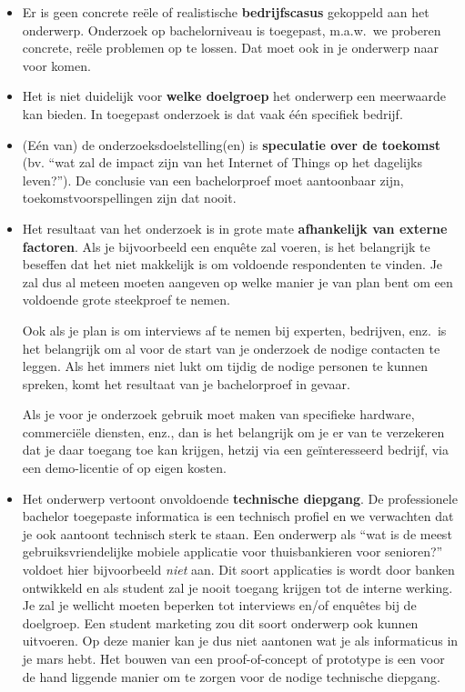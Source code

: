 \begin{itemize}
  \item Er is geen concrete reële of realistische \textbf{bedrijfscasus} gekoppeld aan het onderwerp. Onderzoek op bachelorniveau is toegepast, m.a.w.~we proberen concrete, reële problemen op te lossen. Dat moet ook in je onderwerp naar voor komen.

  \item Het is niet duidelijk voor \textbf{welke doelgroep} het onderwerp een meerwaarde kan bieden. In toegepast onderzoek is dat vaak één specifiek bedrijf.
  \item (Eén van) de onderzoeksdoelstelling(en) is \textbf{speculatie over de toekomst} (bv. ``wat zal de impact zijn van het Internet of Things op het dagelijks leven?''). De conclusie van een bachelorproef moet aantoonbaar zijn, toekomstvoorspellingen zijn dat nooit.

  \item Het resultaat van het onderzoek is in grote mate \textbf{afhankelijk van externe factoren}. Als je bijvoorbeeld een enquête zal voeren, is het belangrijk te beseffen dat het niet makkelijk is om voldoende respondenten te vinden. Je zal dus al meteen moeten aangeven op welke manier je van plan bent om een voldoende grote steekproef te nemen.
  
  Ook als je plan is om interviews af te nemen bij experten, bedrijven, enz.\ is het belangrijk om al voor de start van je onderzoek de nodige contacten te leggen. Als het immers niet lukt om tijdig de nodige personen te kunnen spreken, komt het resultaat van je bachelorproef in gevaar.

  Als je voor je onderzoek gebruik moet maken van specifieke hardware, commerciële diensten, enz., dan is het belangrijk om je er van te verzekeren dat je daar toegang toe kan krijgen, hetzij via een geïnteresseerd bedrijf, via een demo-licentie of op eigen kosten.

  \item Het onderwerp vertoont onvoldoende \textbf{technische diepgang}. De professionele bachelor toegepaste informatica is een technisch profiel en we verwachten dat je ook aantoont technisch sterk te staan. Een onderwerp als ``wat is de meest gebruiksvriendelijke mobiele applicatie voor thuisbankieren voor senioren?'' voldoet hier bijvoorbeeld \textit{niet} aan. Dit soort applicaties is wordt door banken ontwikkeld en als student zal je nooit toegang krijgen tot de interne werking. Je zal je wellicht moeten beperken tot interviews en/of enquêtes bij de doelgroep. Een student marketing zou dit soort onderwerp ook kunnen uitvoeren. Op deze manier kan je dus niet aantonen wat je als informaticus in je mars hebt. Het bouwen van een proof-of-concept of prototype is een voor de hand liggende manier om te zorgen voor de nodige technische diepgang.


\end{itemize}
